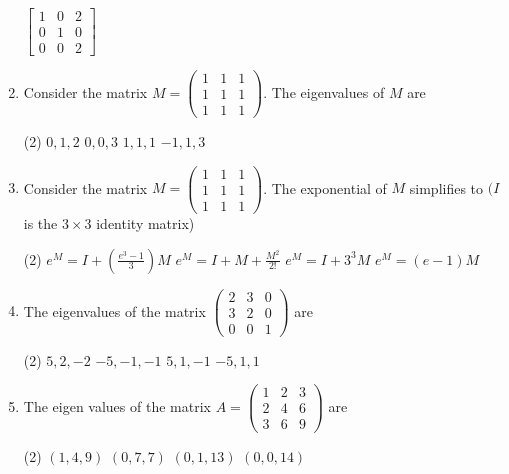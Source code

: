 \begin{enumerate}
\begin{tasks}
		\task[\textbf{d.}] $\left[\begin{array}{lll}1 & 0 & 2 \\ 0 & 1 & 0 \\ 0 & 0 & 2\end{array}\right]$
	\end{tasks}
	\item Consider the matrix $M=\left(\begin{array}{lll}1 & 1 & 1 \\ 1 & 1 & 1 \\ 1 & 1 & 1\end{array}\right) .$ The eigenvalues of $M$ are
	 \begin{tasks}(2)
		\task[\textbf{a.}] $0,1,2$
		\task[\textbf{b.}]$0,0,3$
		\task[\textbf{c.}]$1,1,1$
		\task[\textbf{d.}] $-1,1,3$
	\end{tasks}
	\item Consider the matrix $M=\left(\begin{array}{lll}1 & 1 & 1 \\ 1 & 1 & 1 \\ 1 & 1 & 1\end{array}\right)$. The exponential of $M$ simplifies to $(I$ is the $3 \times 3$ identity matrix)
	 \begin{tasks}(2)
		\task[\textbf{a.}]$e^{M}=I+\left(\frac{e^{3}-1}{3}\right) M$
		\task[\textbf{b.}] $e^{M}=I+M+\frac{M^{2}}{2 !}$
		\task[\textbf{c.}] $e^{M}=I+3^{3} M$
		\task[\textbf{d.}]  $e^{M}=(e-1) M$
	\end{tasks}
	\item The eigenvalues of the matrix $\left(\begin{array}{lll}2 & 3 & 0 \\ 3 & 2 & 0 \\ 0 & 0 & 1\end{array}\right)$ are
	 \begin{tasks}(2)
		\task[\textbf{a.}]$5,2,-2$
		\task[\textbf{b.}]$-5,-1,-1$
		\task[\textbf{c.}]$5,1,-1$
		\task[\textbf{d.}] $-5,1,1$
	\end{tasks}
	\item The eigen values of the matrix $A=\left(\begin{array}{ccc}1 & 2 & 3 \\ 2 & 4 & 6 \\ 3 & 6 & 9\end{array}\right)$ are
	 \begin{tasks}(2)
		\task[\textbf{a.}]$(1,4,9)$
		\task[\textbf{b.}] $(0,7,7)$
		\task[\textbf{c.}]$(0,1,13)$
		\task[\textbf{d.}] $(0,0,14)$

\end{tasks}
\end{enumerate}
